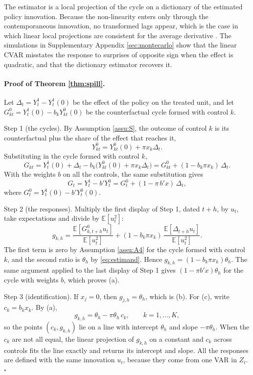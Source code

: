 \documentclass[12pt,a4paper]{article}
\theoremstyle{definition}
\newcommand{\E}{\mathbb{E}}
\begin{document}
The estimator is a local projection of the cycle on a dictionary of the estimated policy innovation. Because the non-linearity enters only through the contemporaneous innovation, no transformed lags appear, which is the case in which linear local projections are consistent for the average derivative \citep{GoncalvesHerreraKilianPesavento2021}. The simulations in Supplementary Appendix \ref{sec:montecarlo} show that the linear CVAR misstates the response to surprises of opposite sign when the effect is quadratic, and that the dictionary estimator recovers it.

\paragraph{Proof of Theorem \ref{thm:spill}.} Let $\Delta_t=Y^1_t-Y^1_t(0)$ be the effect of the policy on the treated unit, and let $G^0_{kt}=Y^1_t(0)-b_kY^0_{kt}(0)$ be the counterfactual cycle formed with control $k$.

Step 1 (the cycles). By Assumption \ref{assu:S}, the outcome of control $k$ is its counterfactual plus the share of the effect that reaches it,
\[
Y^0_{kt}=Y^0_{kt}(0)+\pi x_k\Delta_t .
\]
Substituting in the cycle formed with control $k$,
\[
G_{kt}=Y^1_t(0)+\Delta_t-b_k\big(Y^0_{kt}(0)+\pi x_k\Delta_t\big)=G^0_{kt}+(1-b_k\pi x_k)\,\Delta_t .
\]
With the weights $b$ on all the controls, the same substitution gives
\[
G_t=Y^1_t-b'Y^0_t=G^0_t+(1-\pi\,b'x)\,\Delta_t ,
\]
where $G^0_t=Y^1_t(0)-b'Y^0_t(0)$.

Step 2 (the responses). Multiply the first display of Step 1, dated $t+h$, by $u_t$, take expectations and divide by $\E[u_t^2]$:
\[
g_{k,h}=\frac{\E[G^0_{k,t+h}u_t]}{\E[u_t^2]}+(1-b_k\pi x_k)\,\frac{\E[\Delta_{t+h}u_t]}{\E[u_t^2]} .
\]
The first term is zero by Assumption \ref{assu:A4} for the cycle formed with control $k$, and the second ratio is $\theta_h$ by \eqref{eq:estimand}. Hence $g_{k,h}=(1-b_k\pi x_k)\theta_h$. The same argument applied to the last display of Step 1 gives $(1-\pi b'x)\theta_h$ for the cycle with weights $b$, which proves (a).

Step 3 (identification). If $x_j=0$, then $g_{j,h}=\theta_h$, which is (b). For (c), write $c_k=b_kx_k$. By (a),
\[
g_{k,h}=\theta_h-\pi\theta_h\,c_k ,\qquad k=1,\dots,K ,
\]
so the points $(c_k,g_{k,h})$ lie on a line with intercept $\theta_h$ and slope $-\pi\theta_h$. When the $c_k$ are not all equal, the linear projection of $g_{k,h}$ on a constant and $c_k$ across controls fits the line exactly and returns its intercept and slope. All the responses are defined with the same innovation $u_t$, because they come from one VAR in $Z_t$. $\square$
\end{document}

